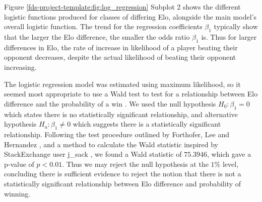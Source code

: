 \documentclass[10pt,a4paper]{article}
\begin{document}
\begin{multicols}{2}
Figure \ref{fds-project-template:fig:log_regression} Subplot 2 shows the different logistic functions produced for classes of differing Elo, alongside the main model's overall logistic function. The trend for the regression coefficients $\beta_{1}$ typically show that the larger the Elo difference, the smaller the odds ratio $\beta_{1}$ is. Thus for larger differences in Elo, the rate of increase in likelihood of a player beating their opponent decreases, despite the actual likelihood of beating their opponent increasing. \newline

The logistic regression model was estimated using maximum likelihood, so it seemed most appropriate to use a Wald test to test for a relationship between Elo difference and the probability of a win \cite{WaldTest}. We used the null hypothesis $H_{0}: \beta_{1} = 0$ which states there is no statistically significant relationship, and alternative hypothesis $H_{a}: \beta_{1} \neq 0$ which suggests there is a statistically significant relationship. Following the test procedure outlined by Forthofer, Lee and Hernandez \cite{WaldTest}, and a method to calculate the Wald statistic inspired by StackExchange user j\_sack \cite{StackExchangeWaldTest}, we found a Wald statistic of $75.3946$, which gave a p-value of $p<0.01$. Thus we may reject the null hypothesis at the $1\%$ level, concluding there is sufficient evidence to reject the notion that there is not a statistically significant relationship between Elo difference and probability of winning. \newline


\end{multicols}
\end{document}
